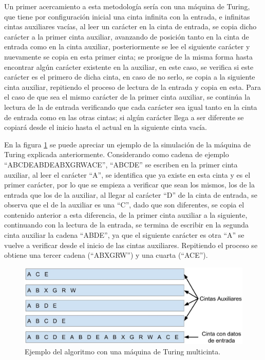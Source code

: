 Un primer acercamiento a esta metodolog\'ia ser\'ia con una m\'aquina de 
 Turing, que tiene por configuraci\'on inicial una cinta infinita
 con la entrada, e infinitas cintas auxiliares vac\'ias, al leer
 un car\'acter en la cinta de entrada, se copia dicho car\'acter a la primer 
 cinta auxiliar, avanzando de posici\'on tanto en la cinta de entrada como 
 en la cinta auxiliar, posteriormente se lee el siguiente car\'acter y 
 nuevamente se copia en esta primer cinta; se prosigue de la misma forma 
 hasta encontrar alg\'un car\'acter existente en la auxiliar, en 
 este caso, se verifica si este car\'acter es el primero de dicha cinta,
 en caso de no serlo, se copia a la siguiente cinta auxiliar, 
 repitiendo el proceso de lectura de la entrada y copia en esta. 
 Para el caso de que sea el mismo car\'acter de la primer cinta auxiliar, 
 se contin\'ua la lectura de la de entrada verificando que cada car\'acter 
 sea igual tanto en la cinta de entrada como en las otras cintas; si alg\'un 
 car\'acter llega a ser diferente se copiar\'a desde el inicio hasta el 
 actual en la siguiente cinta vac\'ia.

  
En la figura \ref{fig:alg01} se puede apreciar un ejemplo de la simulaci\'on de 
 la m\'aquina de Turing explicada anteriormente. Considerando como cadena de 
 ejemplo ``ABCDEABDEABXGRWACE'', ``ABCDE'' se escriben en la primer cinta 
 auxiliar, al leer el car\'acter ``A'', se identifica que ya existe en esta 
 cinta y es el primer car\'acter, por lo que se empieza a verificar que sean
 los mismos, los de la entrada que los de la 
 auxiliar, al llegar al car\'acter ``D'' de la cinta de entrada, se observa 
 que el de la auxiliar es una ``C'', dado que son diferentes, se copia 
 el contenido anterior a esta diferencia, de la primer cinta auxiliar a la
 siguiente, continuando con la lectura de la entrada, se termina 
 de escribir en la segunda cinta auxiliar la cadena ``ABDE'', ya que el 
 siguiente car\'acter es otra ``A'' se vuelve a verificar desde el inicio de 
 las cintas auxiliares.
 Repitiendo el proceso se obtiene una tercer cadena (``ABXGRW'') 
 y una cuarta (``ACE'').
  
\begin{figure}[h]
\centering
\includegraphics[width=1.0\columnwidth]{chap4/Imagenes/algoritmo1.eps}
\caption{Ejemplo del algoritmo con una m\'aquina de Turing multicinta.}
\label{fig:alg01}
\end{figure}
 